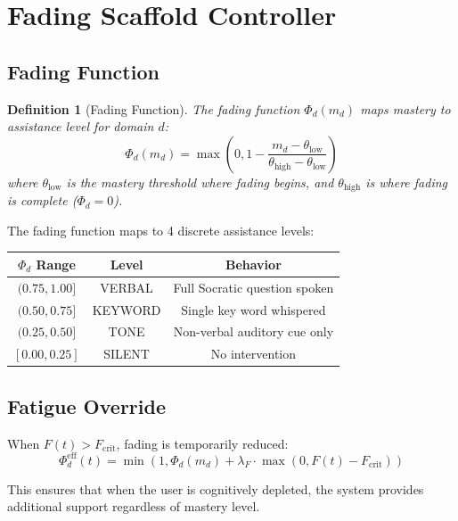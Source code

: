 \documentclass[12pt,a4paper]{article}
\newtheorem{definition}{Definition}[section]
\theoremstyle{remark}
\begin{document}
\section{Fading Scaffold Controller}

\subsection{Fading Function}

\begin{definition}[Fading Function]
The fading function $\Phi_d(m_d)$ maps mastery to assistance level for domain $d$:
\begin{equation}
\Phi_d(m_d) = \max\left(0, 1 - \frac{m_d - \theta_{\text{low}}}{\theta_{\text{high}} - \theta_{\text{low}}}\right)
\label{eq:fading}
\end{equation}
where $\theta_{\text{low}}$ is the mastery threshold where fading begins, and $\theta_{\text{high}}$ is where fading is complete ($\Phi_d = 0$).
\end{definition}

The fading function maps to 4 discrete assistance levels:
\begin{center}
\begin{tabular}{ccc}
\toprule
$\Phi_d$ Range & Level & Behavior \\
\midrule
$(0.75, 1.00]$ & VERBAL & Full Socratic question spoken \\
$(0.50, 0.75]$ & KEYWORD & Single key word whispered \\
$(0.25, 0.50]$ & TONE & Non-verbal auditory cue only \\
$[0.00, 0.25]$ & SILENT & No intervention \\
\bottomrule
\end{tabular}
\end{center}

\subsection{Fatigue Override}

When $F(t) > F_{\text{crit}}$, fading is temporarily reduced:
\begin{equation}
\Phi_d^{\text{eff}}(t) = \min\left(1, \Phi_d(m_d) + \lambda_F \cdot \max(0, F(t) - F_{\text{crit}})\right)
\end{equation}

This ensures that when the user is cognitively depleted, the system provides additional support regardless of mastery level.
\end{document}

